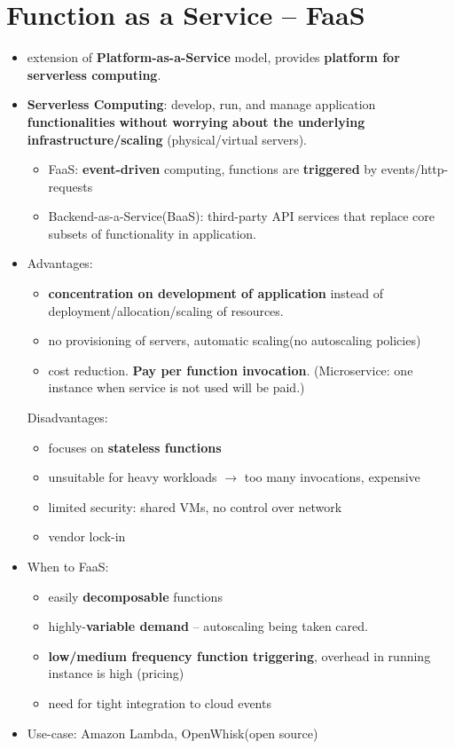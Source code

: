 \section{Function as a Service -- FaaS}
\begin{itemize}
	\item extension of \textbf{Platform-as-a-Service} model, provides \textbf{platform for serverless computing}.
	\item \textbf{Serverless Computing}: develop, run, and manage application \textbf{functionalities} \textbf{without worrying about the underlying infrastructure/scaling} (physical/virtual servers).
	\begin{itemize}
		\item FaaS: \textbf{event-driven} computing, functions are \textbf{triggered} by events/http-requests
		\item Backend-as-a-Service(BaaS): third-party API services that replace core subsets of functionality in application.
	\end{itemize}
	\item Advantages:
	\begin{itemize}
		\item \textbf{concentration on development of application} instead of deployment/allocation/scaling of resources.
		\item no provisioning of servers, automatic scaling(no autoscaling policies)
		\item cost reduction. \textbf{Pay per function invocation}. (Microservice: one instance when service is not used will be paid.)
	\end{itemize}
	Disadvantages: 
	\begin{itemize}
		\item focuses on \textbf{stateless functions}
		\item unsuitable for heavy workloads $\rightarrow$ too many invocations, expensive
		\item limited security: shared VMs, no control over network
		\item vendor lock-in
	\end{itemize}
	\item When to FaaS: 
	\begin{itemize}
		\item easily \textbf{decomposable} functions
		\item highly-\textbf{variable demand} -- autoscaling being taken cared.
		\item \textbf{low/medium frequency function triggering}, overhead in running instance is high (pricing)
		\item need for tight integration to cloud events
	\end{itemize}
	
	
	\item Use-case: Amazon Lambda, OpenWhisk(open source)
	
\end{itemize}

